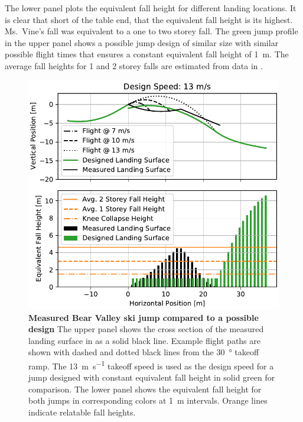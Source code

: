 \documentclass{article}
\begin{document}
The lower panel plots the equivalent fall height for different landing
locations. It is clear that short of the table end, that the equivalent fall
height is its highest. Ms.~Vine's fall was equivalent to a one to two storey
fall. The green jump profile in the upper panel shows a possible jump design of
similar size with similar possible flight times that ensures a constant
equivalent fall height of 1~\si{\meter}. The average fall heights for 1 and 2
storey falls are estimated from data in \cite{Vish2005}.
%
\begin{figure}
  \centering
  \includegraphics[width=5.25in]{figures/vine-v-bear-valley.pdf}
  \caption{\textbf{Measured Bear Valley ski jump compared to a possible design}
  The upper panel shows the cross section of the measured landing surface in as
  a solid black line. Example flight paths are shown with dashed and dotted
  black lines from the 30~\si{\degree} takeoff ramp. The
13~\si{\meter\per\second} takeoff speed is used as the design speed for a jump
designed with constant equivalent fall height in solid green for comparison.
The lower panel shows the equivalent fall height for both jumps in
corresponding
colors at 1~\si{\meter} intervals. Orange lines indicate relatable fall
heights.}
  \label{fig:vine-v-bear-valley}
\end{figure}
\end{document}

